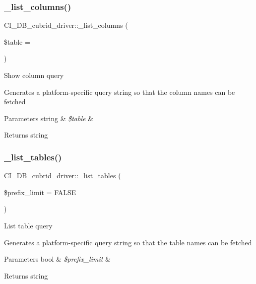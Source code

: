 \subsubsection{\texorpdfstring{\+\_\+list\+\_\+columns()}{\_list\_columns()}}
{\footnotesize\ttfamily C\+I\+\_\+\+D\+B\+\_\+cubrid\+\_\+driver\+::\+\_\+list\+\_\+columns (\begin{DoxyParamCaption}\item[{}]{\$table = {\ttfamily \textquotesingle{}\textquotesingle{}} }\end{DoxyParamCaption})\hspace{0.3cm}{\ttfamily [protected]}}

Show column query

Generates a platform-\/specific query string so that the column names can be fetched


\begin{DoxyParams}[1]{Parameters}
string & {\em \$table} & \\
\hline
\end{DoxyParams}
\begin{DoxyReturn}{Returns}
string 
\end{DoxyReturn}
\mbox{\label{class_c_i___d_b__cubrid__driver_a183f4936d33a4a92e4c8f208557db804}} 
\subsubsection{\texorpdfstring{\+\_\+list\+\_\+tables()}{\_list\_tables()}}
{\footnotesize\ttfamily C\+I\+\_\+\+D\+B\+\_\+cubrid\+\_\+driver\+::\+\_\+list\+\_\+tables (\begin{DoxyParamCaption}\item[{}]{\$prefix\+\_\+limit = {\ttfamily FALSE} }\end{DoxyParamCaption})\hspace{0.3cm}{\ttfamily [protected]}}

List table query

Generates a platform-\/specific query string so that the table names can be fetched


\begin{DoxyParams}[1]{Parameters}
bool & {\em \$prefix\+\_\+limit} & \\
\hline
\end{DoxyParams}
\begin{DoxyReturn}{Returns}
string 
\end{DoxyReturn}
\mbox{\label{class_c_i___d_b__cubrid__driver_aba7305b5e1cd226ffffbf963a3b708d9}} 
